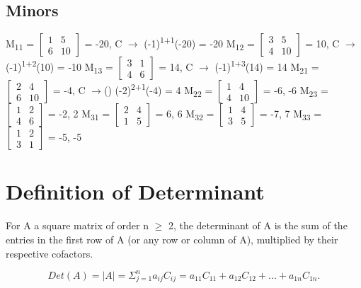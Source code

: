 \documentclass[11pt]{article}
\begin{document}
\subsection{Minors}
\label{sec:org1f0a6c4}
M\textsubscript{11} = \(\begin{bmatrix}1&5\\6&10\end{bmatrix}\) = -20, C \(\rightarrow\) (-1)\textsuperscript{1+1}(-20) = -20
M\textsubscript{12} = \(\begin{bmatrix}3&5\\4&10\end{bmatrix}\) = 10, C \(\rightarrow\) (-1)\textsuperscript{1+2}(10) = -10
M\textsubscript{13} = \(\begin{bmatrix}3&1\\4&6\end{bmatrix}\) = 14, C \(\rightarrow\) (-1)\textsuperscript{1+3}(14) = 14
M\textsubscript{21} = \(\begin{bmatrix}2&4\\6&10\end{bmatrix}\) = -4, C \(\rightarrow\)() (-2)\textsuperscript{2+1}(-4) = 4
M\textsubscript{22} = \(\begin{bmatrix}1&4\\4&10\end{bmatrix}\) = -6, -6
M\textsubscript{23} = \(\begin{bmatrix}1&2\\4&6\end{bmatrix}\) = -2, 2
M\textsubscript{31} = \(\begin{bmatrix}2&4\\1&5\end{bmatrix}\) = 6, 6
M\textsubscript{32} = \(\begin{bmatrix}1&4\\3&5\end{bmatrix}\) = -7, 7
M\textsubscript{33} = \(\begin{bmatrix}1&2\\3&1\end{bmatrix}\) = -5, -5
\section{Definition of Determinant}
\label{sec:org647806a}
For A a square matrix of order n \(\ge\) 2, the determinant of A is the sum of the entries in the first row of A (or any row or column of A), multiplied by their respective cofactors.

\[
Det(A) = |A| = \Sigma_{j=1}^{n}a_{ij}C_{ij} = a_{11}C_{11} + a_{12}C_{12} + ... + a_{1n}C_{1n}.
\]
\end{document}
